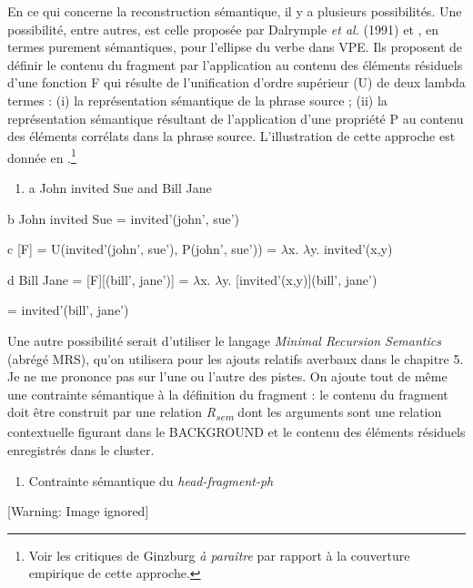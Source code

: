 En ce qui concerne la reconstruction sémantique, il y a plusieurs possibilités. Une possibilité, entre autres, est celle proposée par Dalrymple \textit{et al.} (1991) et \citet{Dalrymple2005}, en termes purement sémantiques, pour l'ellipse du verbe dans VPE. Ils proposent de définir le contenu du fragment par l'application au contenu des éléments résiduels d'une fonction F qui résulte de l'unification d'ordre supérieur (U) de deux lambda termes : (i) la représentation sémantique de la phrase source ; (ii) la représentation sémantique résultant de l'application d'une propriété P au contenu des éléments corrélats dans la phrase source. L'illustration de cette approche est donnée en .\footnote{Voir les critiques de Ginzburg \textit{à paraître} par rapport à la couverture empirique de cette approche.} 


\begin{enumerate}
\item \label{bkm:Ref302390864}a  John invited Sue and Bill Jane


\end{enumerate}
  b  John invited Sue = invited'(john', sue')

  c  [F] = U(invited'(john', sue'), P(john', sue')) = ${\lambda}$x. ${\lambda}$y. invited'(x,y)

  d  Bill Jane = [F][(bill', jane')] = ${\lambda}$x. ${\lambda}$y. [invited'(x,y)](bill', jane') 

      = invited'(bill', jane') 

Une autre possibilité serait d'utiliser le langage \textit{Minimal Recursion Semantics} (abrégé MRS), qu'on utilisera pour les ajouts relatifs averbaux dans le chapitre 5. Je ne me prononce pas sur l'une ou l'autre des pistes. On ajoute tout de même une contrainte sémantique à la définition du fragment : le contenu du fragment doit être construit par une relation \textit{R}\textit{\textsubscript{sem}} dont les arguments sont une relation contextuelle figurant dans le BACKGROUND et le contenu des éléments résiduels enregistrés dans le cluster.


\begin{enumerate}
\item Contrainte sémantique du \textit{head-fragment-ph} 


\end{enumerate}
  [Warning: Image ignored] %
 

